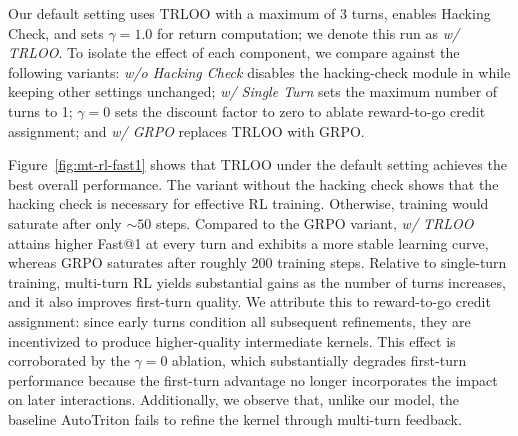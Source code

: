 Our default setting uses TRLOO with a maximum of 3 turns, enables Hacking Check, and sets $\gamma=1.0$ for return computation; we denote this run as \emph{w/ TRLOO}. To isolate the effect of each component, we compare against the following variants: \emph{w/o Hacking Check} disables the hacking-check module in \env{} while keeping other settings unchanged; \emph{w/ Single Turn} sets the maximum number of turns to 1; \emph{$\gamma=0$} sets the discount factor to zero to ablate reward-to-go credit assignment; and \emph{w/ GRPO} replaces TRLOO with GRPO.

Figure~\ref{fig:mt-rl-fast1} shows that TRLOO under the default setting achieves the best overall performance. The variant without the hacking check shows that the hacking check is necessary for effective RL training. Otherwise, training would saturate after only $\sim50$ steps. Compared to the GRPO variant, \emph{w/ TRLOO} attains higher Fast@1 at every turn and exhibits a more stable learning curve, whereas GRPO saturates after roughly 200 training steps. Relative to single-turn training, multi-turn RL yields substantial gains as the number of turns increases, and it also improves first-turn quality. We attribute this to reward-to-go credit assignment: since early turns condition all subsequent refinements, they are incentivized to produce higher-quality intermediate kernels. This effect is corroborated by the \emph{$\gamma=0$} ablation, which substantially degrades first-turn performance because the first-turn advantage no longer incorporates the impact on later interactions. Additionally, we observe that, unlike our model, the baseline AutoTriton fails to refine the kernel through multi-turn feedback.